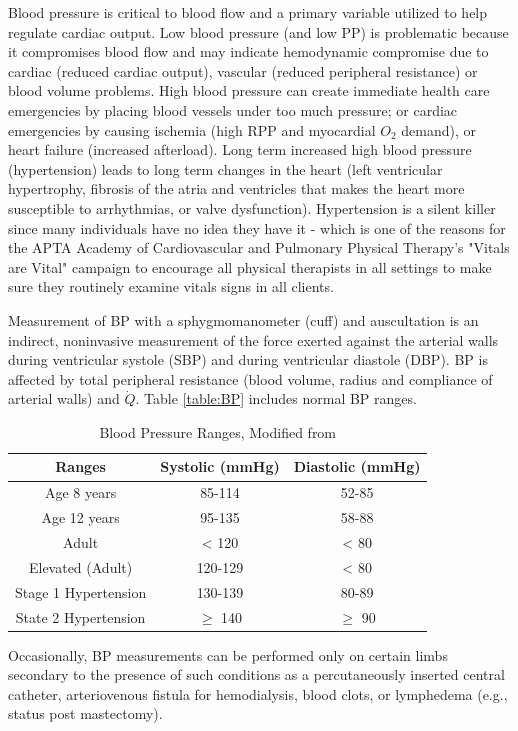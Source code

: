 Blood pressure is critical to blood flow and a primary variable utilized to help regulate cardiac output. Low blood pressure (and low PP) is problematic because it compromises blood flow and may indicate hemodynamic compromise due to cardiac (reduced cardiac output), vascular (reduced peripheral resistance) or blood volume problems. High blood pressure can create immediate health care emergencies by placing blood vessels under too much pressure; or cardiac emergencies by causing ischemia (high RPP and myocardial $O_2$ demand), or heart failure (increased afterload). Long term increased high blood pressure (hypertension) leads to long term changes in the heart (left ventricular hypertrophy, fibrosis of the atria and ventricles that makes the heart more susceptible to arrhythmias, or valve dysfunction). Hypertension is a silent killer since many individuals have no idea they have it - which is one of the reasons for the APTA Academy of Cardiovascular and Pulmonary Physical Therapy's "Vitals are Vital" campaign to encourage all physical therapists in all settings to make sure they routinely examine vitals signs in all clients.

Measurement of BP with a sphygmomanometer (cuff) and auscultation is an indirect, noninvasive measurement of the force exerted against the arterial walls during ventricular systole (SBP) and during ventricular diastole (DBP). BP is affected by total peripheral resistance (blood volume, radius and compliance of arterial walls) and $\dot{Q}$. Table \ref{table:BP} includes normal BP ranges. 

\begin{table}[h!]
\centering
\begin{tabular}{||c c c ||} 
 \hline
 Ranges & Systolic (mmHg) & Diastolic (mmHg) \\ [0.5ex] 
 \hline\hline
Age 8 years & 85-114  & 52-85  \\ 
Age 12 years & 95-135  & 58-88   \\
Adult & < 120   & < 80   \\
Elevated (Adult) & 120-129   & < 80  \\
Stage 1 Hypertension & 130-139  & 80-89   \\
State 2 Hypertension & $\geq$ 140 &  $\geq$ 90 \\ [1ex] 
 \hline
\end{tabular}
\caption{Blood Pressure Ranges, Modified from \cite{collins_cardiac_2019}}
\label{BP}
\end{table}

Occasionally, BP measurements can be performed only on certain limbs secondary to the presence of such conditions as a percutaneously inserted central catheter, arteriovenous fistula for hemodialysis, blood clots, or lymphedema (e.g., status post mastectomy). 

